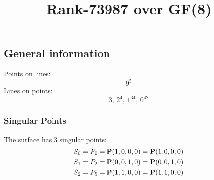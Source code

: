 \documentclass{article}
\newcommand\setTBstruts{\def\T{\rule{0pt}{2.6ex}}%
\def\B{\rule[-1.2ex]{0pt}{0pt}}}
\newcommand{\bP}{{\bf P}}
\begin{document}
 
\setTBstruts



{\allowdisplaybreaks%






\title{Rank-73987 over GF(8)}
\author{}%
\maketitle%
%
{}



\subsection*{General information}
Points on lines:
$$
9^5$$
Lines on points:
$$
3,\,2^4,\,1^{34},\,0^{42}$$
\subsubsection*{Singular Points}
The surface has 3 singular points:\\
\begin{align*}
S_{0} &= P_{0}=\bP(1, 0, 0, 0) = \bP(1, 0, 0, 0)\\
S_{1} &= P_{2}=\bP(0, 0, 1, 0) = \bP(0, 0, 1, 0)\\
S_{2} &= P_{5}=\bP(1, 1, 0, 0) = \bP(1, 1, 0, 0)\\
\end{align*}
}
\end{document}
